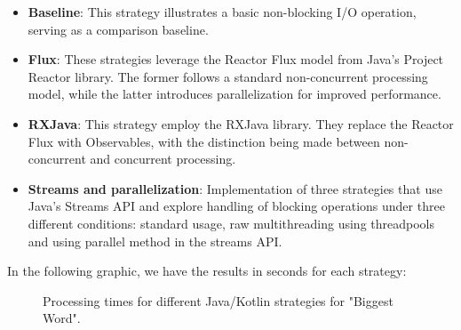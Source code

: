 \begin{itemize}
    \item \textbf{Baseline}: This strategy illustrates a basic non-blocking I/O operation, serving as a comparison baseline.
    \item \textbf{Flux}: These strategies leverage the Reactor Flux model from Java's Project Reactor library. The former follows a standard non-concurrent processing model, while the latter introduces parallelization for improved performance.
    \item \textbf{RXJava}: This strategy employ the RXJava library. They replace the Reactor Flux with Observables, with the distinction being made between non-concurrent and concurrent processing.
    \item \textbf{Streams and parallelization}: Implementation of three strategies that use Java's Streams API and explore handling of blocking operations under three different conditions: standard usage, raw multithreading using threadpools and using parallel method in the streams API.
    
\end{itemize}


In the following graphic, we have the results in seconds for each strategy:

    \begin{figure}[H]
        \raggedright
        \caption{Processing times for different Java/Kotlin strategies for "Biggest Word".}
        \label{fig:biggest_word_processing_times}
    \end{figure}
    


